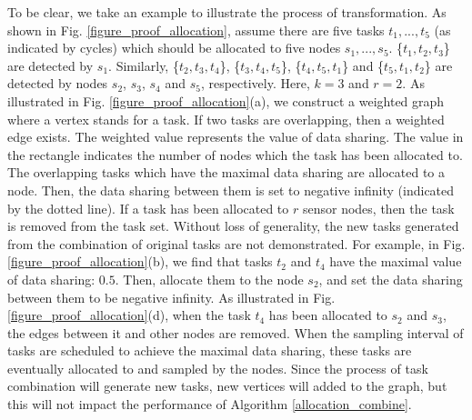 \documentclass[prodmode,acmtosn]{acmsmall}
\begin{document}
To be clear, we take an example to illustrate the process of transformation. As shown in Fig. \ref{figure_proof_allocation}, assume there are five tasks $t_1,...,t_5$ (as indicated by cycles) which should be allocated to five nodes $s_1,...,s_5$.  \{$t_1,t_2,t_3$\} are detected by $s_1$. Similarly,  \{$t_2,t_3,t_4$\}, \{$t_3,t_4,t_5$\}, \{$t_4,t_5,t_1$\} and \{$t_5,t_1,t_2$\} are detected by nodes $s_2$, $s_3$, $s_4$ and $s_5$, respectively. Here, $k\mathrm{=}3$ and $r\mathrm{=}2$. As illustrated in Fig. \ref{figure_proof_allocation}(a), we construct a weighted graph where a vertex stands for a task. If two tasks are overlapping, then a weighted edge exists. The weighted value represents the value of data sharing. The value in the rectangle indicates the number of nodes which the task has been allocated to. The overlapping tasks which have the maximal data sharing are allocated to a node. Then, the data sharing between them is set to negative infinity (indicated by the dotted line). If a task has been allocated to $r$ sensor nodes, then the task is removed from the task set. Without loss of generality, the new tasks generated from the combination of original tasks are not demonstrated. For example, in Fig. \ref{figure_proof_allocation}(b), we find that tasks $t_2$ and $t_4$ have the maximal value of data sharing: $0.5$. Then, allocate them to the node $s_2$, and set the data sharing between them to be negative infinity. As illustrated in Fig. \ref{figure_proof_allocation}(d), when the task $t_4$ has been allocated to $s_2$ and $s_3$, the edges between it and other nodes are removed. When the sampling interval of tasks are scheduled to achieve the maximal data sharing, these tasks are eventually allocated to and sampled by the nodes. Since the process of task combination will generate new tasks, new vertices will added to the graph, but this will not impact the performance of Algorithm \ref{allocation_combine}.

\end{document}
